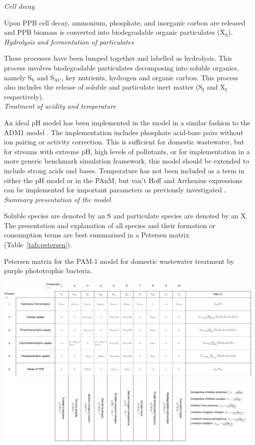 \noindent\textit{Cell decay}\par
\noindent Upon PPB cell decay, ammonium, phosphate, and inorganic carbon are released and PPB biomass is converted into biodegradable organic particulates ($\mathrm{X_S}$). \\

\noindent\textit{Hydrolysis and fermentation of particulates}\par
\noindent These processes have been lumped together and labelled as hydrolysis. This process involves biodegradable particulates decomposing into soluble organics, namely $\mathrm{S_S}$ and $\mathrm{S_{AC}}$, key nutrients, hydrogen and organic carbon. This process also includes the release of soluble and particulate inert matter ($\mathrm{S_I}$ and $\mathrm{X_{I}}$ respectively). \\

\noindent\textit{Treatment of acidity and temperature}\par
\noindent An ideal pH model has been implemented in the model in a similar fashion to the ADM1 model \cite{batstone2002}. The implementation includes phosphate acid-base pairs without ion pairing or activity correction. This is sufficient for domestic wastewater, but for streams with extreme pH, high levels of pollutants, or for implementation in a more generic benchmark simulation framework, this model should be extended to include strong acids and bases. Temperature has not been included as a term in either the pH model or in the PAnM, but van't Hoff and Arrhenius expressions can be implemented for important parameters as previously investigated \cite{hulsen2016a}. \\

\noindent\textit{Summary presentation of the model}\par
\noindent  Soluble species are denoted by an $\mathrm{S}$ and particulate species are denoted by an $\mathrm{X}$. The presentation and explanation of all species and their formation or consumption terms are best summarised in a Petersen matrix (Table~\ref{tab:petersen}).

 \begin{table}
    \caption{Petersen matrix for the PAM-1 model for domestic wastewater treatment by purple phototrophic bacteria.}
    \label{tab:petersen}
    \includegraphics[width=1\linewidth]{Tables/petersen/petersen.pdf}
\end{table}

